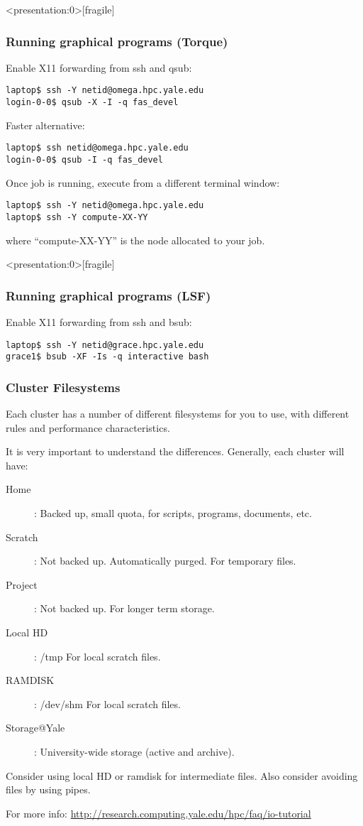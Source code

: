 \documentclass[10pt]{beamer}
\begin{document}
\begin{frame}<presentation:0>[fragile]
\frametitle{Running graphical programs (Torque)}
Enable X11 forwarding from ssh and qsub:
\begin{verbatim}
laptop$ ssh -Y netid@omega.hpc.yale.edu
login-0-0$ qsub -X -I -q fas_devel
\end{verbatim}

Faster alternative:
\begin{verbatim}
laptop$ ssh netid@omega.hpc.yale.edu
login-0-0$ qsub -I -q fas_devel
\end{verbatim}

Once job is running, execute from a different terminal window:
\begin{verbatim}
laptop$ ssh -Y netid@omega.hpc.yale.edu
laptop$ ssh -Y compute-XX-YY
\end{verbatim}

where ``compute-XX-YY'' is the node allocated to your job.
\end{frame}

\begin{frame}<presentation:0>[fragile]
\frametitle{Running graphical programs (LSF)}
Enable X11 forwarding from ssh and bsub:
\begin{verbatim}
laptop$ ssh -Y netid@grace.hpc.yale.edu
grace1$ bsub -XF -Is -q interactive bash
\end{verbatim}
\end{frame}

\begin{frame}[fragile]
\frametitle{Cluster Filesystems}
Each cluster has a number of different filesystems for you to use, with different
rules and performance characteristics.  

\vskip10pt

It is very important to understand the differences.  Generally, each cluster will have:

\begin{description}
\item[Home]: Backed up, small quota, for scripts, programs, documents, etc.
\item[Scratch]: Not backed up.  Automatically purged.  For temporary files.
\item[Project]: Not backed up.  For longer term storage.
\item[Local HD]: /tmp  For local scratch files.
\item[RAMDISK]: /dev/shm For local scratch files.
\item[Storage@Yale]: University-wide storage (active and archive).
\end{description}

Consider using local HD or ramdisk for intermediate files.  Also consider avoiding files by using pipes.

For more info: \url{http://research.computing.yale.edu/hpc/faq/io-tutorial}

\end{frame}
\end{document}
